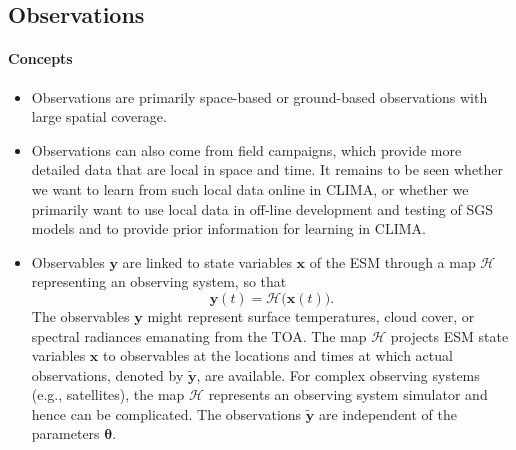\documentclass{article}
\renewcommand{\vec}[1]{\boldsymbol{{#1}}}
\begin{document}
\subsection{Observations}

\paragraph{Concepts}
\begin{itemize}
    \item Observations are primarily space-based or ground-based observations with large spatial coverage.
    \item Observations can also come from field campaigns, which provide more detailed data that are local in space and time. It remains to be seen whether we want to learn from such local data online in CLIMA, or whether we primarily want to use local data in off-line development and testing of SGS models and to provide prior information for learning in CLIMA.
    \item Observables $\vec{y}$ are linked to state variables $\vec{x}$ of the ESM through a map $\mathcal{H}$ representing an observing system, so that 
    \begin{equation}
    \vec{y}(t)=\mathcal{H}\bigl(\vec{x}(t)\bigr).
    \end{equation}
    The observables $\vec{y}$ might represent surface temperatures, cloud cover, or spectral radiances emanating from the TOA. The map $\mathcal{H}$ projects ESM state variables $\vec{x}$ to observables at the locations and times at which actual observations, denoted by $\vec{\tilde y}$, are available. For complex observing systems (e.g., satellites), the map $\mathcal{H}$ represents an observing system simulator and hence can be complicated. The observations $\vec{\tilde y}$ are independent of the parameters $\vec{\theta}$.
\end{itemize}
\end{document}
